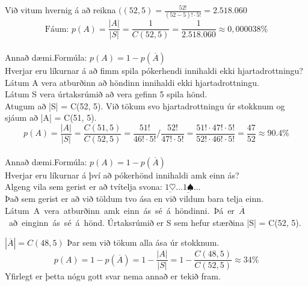 Við vitum hvernig á að reikna $((52, 5) = \frac{52!}{(52-5)! \cdot 5!} = 2.518.060$
\begin{equation*}
    \text{Fáum: } p(A) = \frac{ |A| }{ |S| } = \frac{1}{C(52,5)} = \frac{1}{2.518.060} \approx 0,000038\%
\end{equation*}\vspace*{1em}\\
Annað dæmi.\qquad Formúla: $p(A) = 1- p(\overline{A}) $\vspace*{0.3em}\\
Hverjar eru líkurnar á að fimm spila pókerhendi innihaldi ekki hjartadrottningu?\vspace*{0.3em}\\
Látum A vera atburðinn að höndinn innihaldi ekki hjartadrottningu.\\
Látum S vera úrtaksrúmið að vera gefinn 5 spila hönd.\\
Atugum að |S| = C(52, 5). Við tökum svo hjartadrottningu úr stokknum og sjáum að |A| = C(51, 5).
\begin{equation*}
    p(A) = \frac{ |A| }{ |S| } = \frac{C(51,5)}{C(52,5)} = \frac{51!}{46! \cdot 5!} / \frac{52!}{47! \cdot 5!} = \frac{51! \cdot 47! \cdot 5!}{52! \cdot 46! \cdot 5!} = \frac{47}{52} \approx 90.4\%
\end{equation*}\\
\newpage
\hspace*{-1.3em}Annað dæmi.\qquad Formúla: $p(A) = 1- p(\overline{A}) $\vspace*{0.3em}\\
Hverjar eru líkurnar á því að pókerhönd innihaldi amk einn ás?\vspace*{0.3em}\\
Algeng vila sem gerist er að tvítelja svona: $\underline{1\heartsuit} \ldots \underline{1\spadesuit } \ldots$\\
Það sem gerist er að við töldum tvo ása en við vildum bara telja einn.\vspace*{0.5em}\\
\hbox{Látum A vera atburðinn amk einn ás sé á höndinni. Þá er $\overline{A}$ að einginn ás sé á hönd.}
Úrtaksrúmið er S sem hefur stærðina |S| = C(52, 5).\vspace*{0.4em}

$|\overline{A}| = C(48,5)$ Þar sem við tökum alla ása úr stokknum.
\begin{equation*}
    p(A)= 1- p(\overline{A}) = 1 - \frac{ |A| }{ |S| } = 1 - \frac{C(48,5)}{C(52,5)} \approx 34\%
\end{equation*}
Yfirlegt er þetta nógu gott svar nema annað er tekið fram.\\



